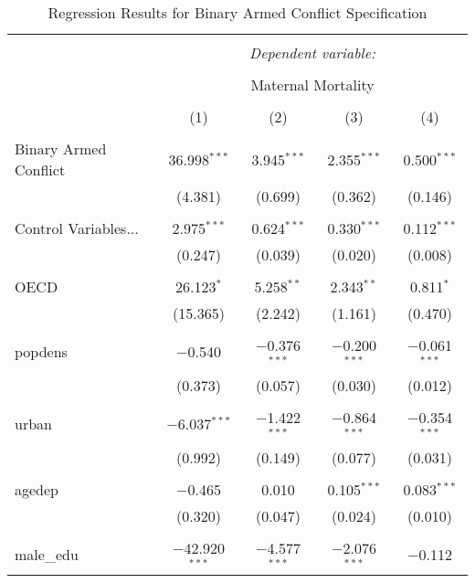 
\begin{table}[!htbp] \centering 
  \caption{Regression Results for Binary Armed Conflict Specification} 
  \label{} 
\begin{tabular}{@{\extracolsep{5pt}}lcccc} 
\\[-1.8ex]\hline 
\hline \\[-1.8ex] 
 & \multicolumn{4}{c}{\textit{Dependent variable:}} \\ 
\cline{2-5} 
\\[-1.8ex] & \multicolumn{4}{c}{Maternal Mortality} \\ 
\\[-1.8ex] & (1) & (2) & (3) & (4)\\ 
\hline \\[-1.8ex] 
 Binary Armed Conflict & 36.998$^{***}$ & 3.945$^{***}$ & 2.355$^{***}$ & 0.500$^{***}$ \\ 
  & (4.381) & (0.699) & (0.362) & (0.146) \\ 
  & & & & \\ 
 Control Variables... & 2.975$^{***}$ & 0.624$^{***}$ & 0.330$^{***}$ & 0.112$^{***}$ \\ 
  & (0.247) & (0.039) & (0.020) & (0.008) \\ 
  & & & & \\ 
 OECD & 26.123$^{*}$ & 5.258$^{**}$ & 2.343$^{**}$ & 0.811$^{*}$ \\ 
  & (15.365) & (2.242) & (1.161) & (0.470) \\ 
  & & & & \\ 
 popdens & $-$0.540 & $-$0.376$^{***}$ & $-$0.200$^{***}$ & $-$0.061$^{***}$ \\ 
  & (0.373) & (0.057) & (0.030) & (0.012) \\ 
  & & & & \\ 
 urban & $-$6.037$^{***}$ & $-$1.422$^{***}$ & $-$0.864$^{***}$ & $-$0.354$^{***}$ \\ 
  & (0.992) & (0.149) & (0.077) & (0.031) \\ 
  & & & & \\ 
 agedep & $-$0.465 & 0.010 & 0.105$^{***}$ & 0.083$^{***}$ \\ 
  & (0.320) & (0.047) & (0.024) & (0.010) \\ 
  & & & & \\ 
 male\_edu & $-$42.920$^{***}$ & $-$4.577$^{***}$ & $-$2.076$^{***}$ & $-$0.112 \\ 

\end{tabular}
\end{table}
